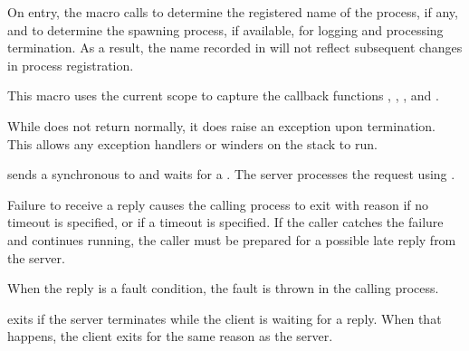 On entry, the macro calls  to determine the
registered name of the process, if any, and  to
determine the spawning process, if available, for logging and
processing termination. As a result, the name recorded in
 will not reflect subsequent changes in
process registration.

This macro uses the current scope to capture the callback functions
, , , and
.

While  does not return normally, it does
raise an exception upon termination. This allows any exception
handlers or winders on the stack to run.

\begin{procedure}
\end{procedure}
\returns{}

\begin{argtbl}
\end{argtbl}

 sends a synchronous  to
 and waits for a . The server processes the
request using .

Failure to receive a reply causes the calling process to exit with
reason  if no timeout is specified, or  if
a timeout is specified. If the caller catches the failure and
continues running, the caller must be prepared for a possible late
reply from the server.

When the reply is a fault condition, the fault is thrown in the
calling process.

 exits if the server terminates while the
client is waiting for a reply. When that happens, the client exits for
the same reason as the server.

\begin{procedure}
\end{procedure}
\returns{}


